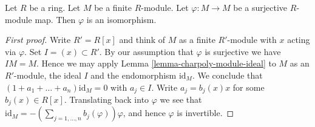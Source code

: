 \begin{lemma}
\label{lemma-fun}
Let $R$ be a ring.
Let $M$ be a finite $R$-module.
Let $\varphi : M \to M$ be a surjective $R$-module map.
Then $\varphi$ is an isomorphism.
\end{lemma}

\begin{proof}[First proof]
Write $R' = R[x]$ and think of $M$ as a finite $R'$-module with
$x$ acting via $\varphi$. Set $I = (x) \subset R'$. By our assumption that
$\varphi$ is surjective we have $IM = M$. Hence we may apply
Lemma \ref{lemma-charpoly-module-ideal}
to $M$ as an $R'$-module, the ideal $I$ and the endomorphism $\text{id}_M$.
We conclude that
$(1 + a_1 + \ldots + a_n)\text{id}_M = 0$ with $a_j \in I$.
Write $a_j = b_j(x)x$ for some $b_j(x) \in R[x]$.
Translating back into $\varphi$ we see that
$\text{id}_M = -(\sum_{j = 1, \ldots, n} b_j(\varphi)) \varphi$, and hence
$\varphi$ is invertible.
\end{proof}